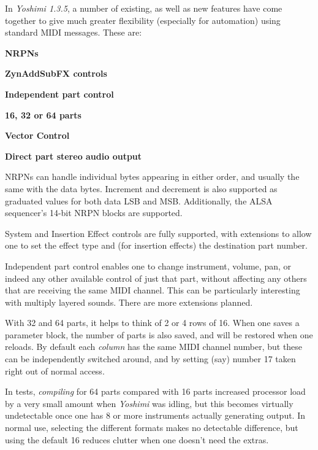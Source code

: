    In \textsl{Yoshimi 1.3.5}, a number of existing, as well as new features
   have come together to give much greater flexibility (especially for
   automation) using standard MIDI messages. These are:

   \begin{enumber}
      \item \textbf{NRPNs}
      \item \textbf{ZynAddSubFX controls}
      \item \textbf{Independent part control}
      \item \textbf{16, 32 or 64 parts}
      \item \textbf{Vector Control}
      \item \textbf{Direct part stereo audio output}
   \end{enumber}

   \setcounter{ItemCounter}{0}      %

   NRPNs can handle individual bytes appearing in either order, and usually the
   same with the data bytes. Increment and decrement is also supported as
   graduated values for both data LSB and MSB. Additionally, the ALSA
   sequencer's 14-bit NRPN blocks are supported.

   System and Insertion Effect controls are fully supported, with extensions
   to allow one to set the effect type and (for insertion effects) the
   destination part number.

   Independent part control enables one to change instrument, volume, pan, or
   indeed any other available control of just that part, without affecting any
   others that are receiving the same MIDI channel. This can be particularly
   interesting with multiply layered sounds. There are more extensions planned.

   With 32 and 64 parts, it helps to think of 2 or 4 rows of 16. When one
   saves a parameter block, the number of parts is also saved, and will be
   restored when one reloads.  By default each \textsl{column} has the same
   MIDI channel number, but these can be independently switched around, and
   by setting (say) number 17 taken right out of normal access.

   In tests, \textsl{compiling} for 64 parts compared with 16 parts increased
   processor load by a very small amount when \textsl{Yoshimi} was idling,
   but this becomes virtually undetectable once one has 8 or more instruments
   actually generating output. In normal use, selecting the different formats
   makes no detectable difference, but using the default 16 reduces clutter
   when one doesn't need the extras.

